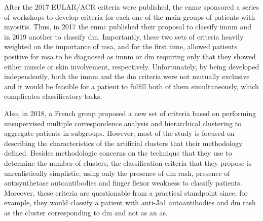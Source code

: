 After the 2017 EULAR/ACR criteria were published, the \Gls{enmc} sponsored a series of workshops to develop criteria for each one of the main groups of patients with myositis. Thus, in 2017 the \Gls{enmc} published their proposal to classify \gls{imnm}\cite{Allenbach2017} and in 2019 another to classify \gls{dm}.\cite{Mammen2020} Importantly, these two sets of criteria heavily weighted on the importance of \gls{msa}, and for the first time, allowed patients positive for \gls{msa} to be diagnosed as \gls{imnm} or \gls{dm} requiring only that they showed either muscle or skin involvement, respectively. Unfortunately, by being developed independently, both the \gls{imnm} and the \gls{dm} criteria were not mutually exclusive and it would be feasible for a patient to fulfill both of them simultaneously, which complicates classificatory tasks.

Also, in 2018, a French group proposed a new set of criteria based on performing unsupervised multiple correspondence analysis and hierarchical clustering to aggregate patients in subgroups.\cite{Mariampillai2018} However, most of the study is focused on describing the characteristics of the artificial clusters that their methodology defined. Besides methodologic concerns on the technique that they use to determine the number of clusters,\cite{PinalFernandez2019} the classification criteria that they propose is unrealistically simplistic, using only the presence of \gls{dm} rash, presence of antisynthetase autoantibodies and finger flexor weakness to classify patients. Moreover, these criteria are questionable from a practical standpoint since, for example, they would classify a patient with anti-Jo1 autoantibodies and \gls{dm} rash as the cluster corresponding to \gls{dm} and not as an \gls{as}.


